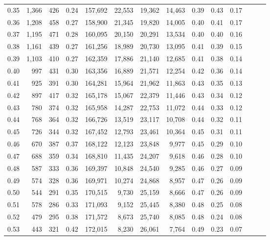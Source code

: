 \begin{tabular}{rrrrrrrrrrrrrr}
0.35 &  1,366 &  426 &  0.24 &  157,692 &   22,553 &  19,362 &  14,463 &  0.39 &  0.43 &      0.17 \\
0.36 &  1,208 &  458 &  0.27 &  158,900 &   21,345 &  19,820 &  14,005 &  0.40 &  0.41 &      0.17 \\
0.37 &  1,195 &  471 &  0.28 &  160,095 &   20,150 &  20,291 &  13,534 &  0.40 &  0.40 &      0.16 \\
0.38 &  1,161 &  439 &  0.27 &  161,256 &   18,989 &  20,730 &  13,095 &  0.41 &  0.39 &      0.15 \\
0.39 &  1,103 &  410 &  0.27 &  162,359 &   17,886 &  21,140 &  12,685 &  0.41 &  0.38 &      0.14 \\
0.40 &    997 &  431 &  0.30 &  163,356 &   16,889 &  21,571 &  12,254 &  0.42 &  0.36 &      0.14 \\
0.41 &    925 &  391 &  0.30 &  164,281 &   15,964 &  21,962 &  11,863 &  0.43 &  0.35 &      0.13 \\
0.42 &    897 &  417 &  0.32 &  165,178 &   15,067 &  22,379 &  11,446 &  0.43 &  0.34 &      0.12 \\
0.43 &    780 &  374 &  0.32 &  165,958 &   14,287 &  22,753 &  11,072 &  0.44 &  0.33 &      0.12 \\
0.44 &    768 &  364 &  0.32 &  166,726 &   13,519 &  23,117 &  10,708 &  0.44 &  0.32 &      0.11 \\
0.45 &    726 &  344 &  0.32 &  167,452 &   12,793 &  23,461 &  10,364 &  0.45 &  0.31 &      0.11 \\
0.46 &    670 &  387 &  0.37 &  168,122 &   12,123 &  23,848 &   9,977 &  0.45 &  0.29 &      0.10 \\
0.47 &    688 &  359 &  0.34 &  168,810 &   11,435 &  24,207 &   9,618 &  0.46 &  0.28 &      0.10 \\
0.48 &    587 &  333 &  0.36 &  169,397 &   10,848 &  24,540 &   9,285 &  0.46 &  0.27 &      0.09 \\
0.49 &    574 &  328 &  0.36 &  169,971 &   10,274 &  24,868 &   8,957 &  0.47 &  0.26 &      0.09 \\
0.50 &    544 &  291 &  0.35 &  170,515 &    9,730 &  25,159 &   8,666 &  0.47 &  0.26 &      0.09 \\
0.51 &    578 &  286 &  0.33 &  171,093 &    9,152 &  25,445 &   8,380 &  0.48 &  0.25 &      0.08 \\
0.52 &    479 &  295 &  0.38 &  171,572 &    8,673 &  25,740 &   8,085 &  0.48 &  0.24 &      0.08 \\
0.53 &    443 &  321 &  0.42 &  172,015 &    8,230 &  26,061 &   7,764 &  0.49 &  0.23 &      0.07 \\

\end{tabular}
